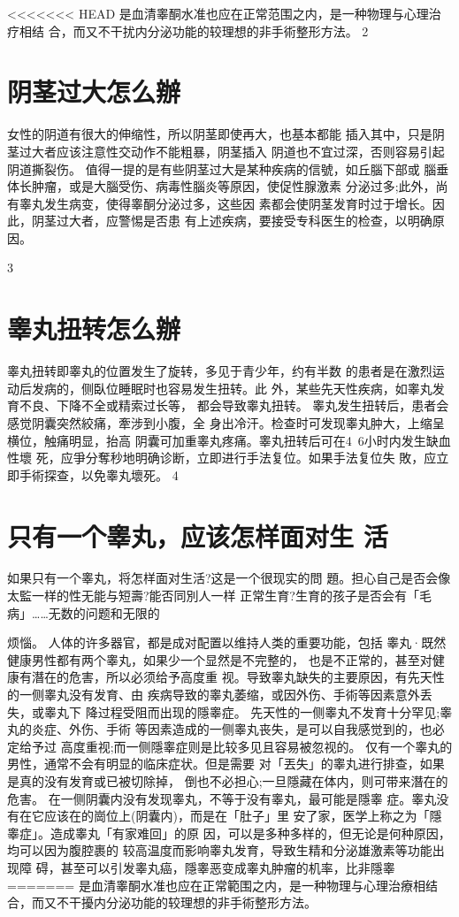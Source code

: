 \documentclass[12pt,UTF8]{ctexbook}
\begin{document}
<<<<<<< HEAD
是血清睾酮水准也应在正常范围之内，是一种物理与心理治疗相结
合，而又不干扰内分泌功能的较理想的非手術整形方法。
2
\section{阴茎过大怎么辦}
女性的阴道有很大的伸缩性，所以阴茎即使再大，也基本都能
插入其中，只是阴茎过大者应该注意性交动作不能粗暴，阴茎插入
阴道也不宜过深，否则容易引起阴道撕裂伤。
值得一提的是有些阴茎过大是某种疾病的信號，如丘腦下部或
腦垂体长肿瘤，或是大腦受伤、病毒性腦炎等原因，使促性腺激素
分泌过多;此外，尚有睾丸发生病变，使得睾酮分泌过多，这些因
素都会使阴茎发育时过于增长。因此，阴茎过大者，应警惕是否患
有上述疾病，要接受专科医生的检查，以明确原因。

3
\section{睾丸扭转怎么辦}
睾丸扭转即睾丸的位置发生了旋转，多见于青少年，约有半数
的患者是在激烈运动后发病的，侧臥位睡眠时也容易发生扭转。此
外，某些先天性疾病，如睾丸发育不良、下降不全或精索过长等，
都会导致睾丸扭转。
睾丸发生扭转后，患者会感觉阴囊突然絞痛，牽涉到小腹，全
身出冷汗。检查时可发现睾丸肿大，上缩呈横位，触痛明显，抬高
阴囊可加重睾丸疼痛。睾丸扭转后可在4~6小时内发生缺血性壞
死，应爭分奪秒地明确诊断，立即进行手法复位。如果手法复位失
敗，应立即手術探查，以免睾丸壞死。
4
\section{只有一个睾丸，应该怎样面对生
活}
如果只有一个睾丸，将怎样面对生活?这是一个很现实的問
題。担心自己是否会像太監一样的性无能与短壽?能否同別人一样
正常生育?生育的孩子是否会有「毛病」……无数的问题和无限的

烦惱。
人体的许多器官，都是成对配置以维持人类的重要功能，包括
睾丸·既然健康男性都有两个睾丸，如果少一个显然是不完整的，
也是不正常的，甚至对健康有潛在的危害，所以必须给予高度重
视。导致睾丸缺失的主要原因，有先天性的一侧睾丸没有发育、由
疾病导致的睾丸萎缩，或因外伤、手術等因素意外丢失，或睾丸下
降过程受阻而出现的隱睾症。
先天性的一侧睾丸不发育十分罕见;睾丸的炎症、外伤、手術
等因素造成的一侧睾丸丧失，是可以自我感觉到的，也必定给予过
高度重视;而一侧隱睾症则是比较多见且容易被忽视的。
仅有一个睾丸的男性，通常不会有明显的临床症状。但是需要
对「丟失」的睾丸进行排查，如果是真的没有发育或已被切除掉，
倒也不必担心;一旦隱藏在体内，则可带来潛在的危害。
在一侧阴囊内没有发现睾丸，不等于没有睾丸，最可能是隱睾
症。睾丸没有在它应该在的崗位上(阴囊内)，而是在「肚子」里
安了家，医学上称之为「隱睾症」。造成睾丸「有家难回」的原
因，可以是多种多样的，但无论是何种原因，均可以因为腹腔裹的
较高温度而影响睾丸发育，导致生精和分泌雄激素等功能出现障
碍，甚至可以引发睾丸癌，隱睾恶变成睾丸肿瘤的机率，比非隱睾
=======
是血清睾酮水准也应在正常範围之内，是一种物理与心理治療相结
合，而又不干擾内分泌功能的较理想的非手術整形方法。
\end{document}
